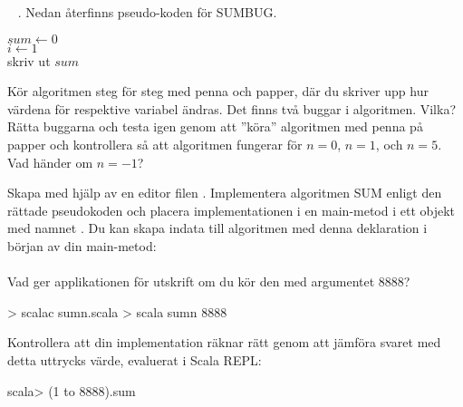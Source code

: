 \TaskSolved \what

\begin{ConceptConnections}

\end{ConceptConnections}

\QUESTEND







\QUESTBEGIN

\Task  \what~ . Nedan återfinns pseudo-koden för SUMBUG.

\begin{algorithm}[H]

 $sum \leftarrow 0$ \\
 $i \leftarrow 1$  \\
 skriv ut $sum$
\end{algorithm}

\Subtask Kör algoritmen steg för steg med penna och papper, där du skriver upp hur värdena för respektive variabel ändras. Det finns två buggar i algoritmen. Vilka? Rätta buggarna och testa igen genom att ''köra'' algoritmen med penna på papper och kontrollera så att algoritmen fungerar för $n=0$, $n=1$, och $n=5$. Vad händer om $n=-1$?

\Subtask Skapa med hjälp av en editor filen . Implementera algoritmen SUM enligt den rättade pseudokoden och placera implementationen i en main-metod i ett objekt med namnet . Du kan skapa indata  till algoritmen med denna deklaration i början av din main-metod: \\  \\ Vad ger applikationen för utskrift om du kör den med argumentet 8888?

\begin{REPLnonum}
> scalac sumn.scala
> scala sumn 8888
\end{REPLnonum}

\noindent Kontrollera att din implementation räknar rätt genom att jämföra svaret med detta uttrycks värde, evaluerat i Scala REPL:
\begin{REPLnonum}
scala> (1 to 8888).sum
\end{REPLnonum}


